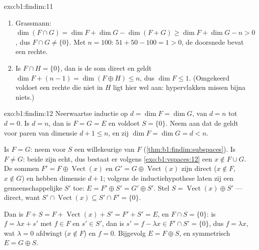 \begin{solution}{exo:b1:findim:11}
\begin{enumerate}
  \item Grassmann: $\dim(F \cap G) = \dim F + \dim G - \dim(F + G)
        \geq \dim F + \dim G - n > 0$, dus $F \cap G \neq \{0\}$.
        Met $n = 100$: $51 + 50 - 100 = 1 > 0$, de doorsnede bevat
        een rechte.
  \item Is $F \cap H = \{0\}$, dan is de som direct en geldt $\dim F
        + (n - 1) = \dim(F \oplus H) \leq n$, dus $\dim F \leq 1$.
        (Omgekeerd voldoet een rechte die niet in $H$ ligt hier wel
        aan: hypervlakken missen bijna niets.)
\end{enumerate}
\end{solution}

\begin{solution}{exo:b1:findim:12}
Neerwaartse inductie op $d = \dim F = \dim G$, van $d = n$ tot $d =
0$. Is $d = n$, dan is $F = G = E$ en voldoet $S = \{0\}$. Neem aan
dat de  geldt voor paren  van dimensie $d + 1
\leq n$, en zij $\dim F = \dim G = d < n$.

Is $F = G$: neem voor $S$ een willekeurige  van $F$
(\cref{thm:b1:findim:subspaces}). Is $F \neq G$: beide zijn echt,
dus bestaat er volgens \cref{exo:b1:vspaces:12} een $x \notin F \cup
G$. De sommen $F' = F \oplus \operatorname{Vect}(x)$ en $G' = G
\oplus \operatorname{Vect}(x)$ zijn direct ($x \notin F$, $x \notin
G$) en hebben dimensie $d + 1$; volgens de inductiehypothese laten
zij een gemeenschappelijke  $S'$ toe: $E = F' \oplus
S' = G' \oplus S'$. Stel $S = \operatorname{Vect}(x) \oplus S'$ ---
direct, want $S' \cap \operatorname{Vect}(x) \subseteq S' \cap F' =
\{0\}$.

Dan is $F + S = F + \operatorname{Vect}(x) + S' = F' + S' = E$, en
$F \cap S = \{0\}$: is $f = \lambda x + s'$ met $f \in F$ en $s' \in
S'$, dan is $s' = f - \lambda x \in F' \cap S' = \{0\}$, dus $f =
\lambda x$, wat $\lambda = 0$ afdwingt ($x \notin F$) en $f = 0$.
Bijgevolg $E = F \oplus S$, en symmetrisch $E = G \oplus S$.
\end{solution}

